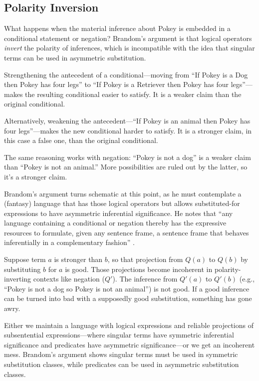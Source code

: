 \documentclass[12pt]{book}
\begin{document}
\subsection*{Polarity Inversion}\label{polarity-inversion}

What happens when the material inference about Pokey is embedded in a conditional statement or negation? Brandom's argument is that logical operators \emph{invert} the polarity of inferences, which is incompatible with the idea that singular terms can be used in asymmetric substitution.

Strengthening the antecedent of a conditional---moving from ``If Pokey is a Dog then Pokey has four legs'' to ``If Pokey is a Retriever then Pokey has four legs''---makes the resulting conditional easier to satisfy. It is a weaker claim than the original conditional.

Alternatively, weakening the antecedent---``If Pokey is an animal then Pokey has four legs''---makes the new conditional harder to satisfy. It is a stronger claim, in this case a false one, than the original conditional.

The same reasoning works with negation: ``Pokey is not a dog'' is a weaker claim than ``Pokey is not an animal.'' More possibilities are ruled out by the latter, so it's a stronger claim.

Brandom's argument turns schematic at this point, as he must contemplate a (fantasy) language that has those logical operators but allows substituted-for expressions to have asymmetric inferential significance. He notes that ``any language containing a conditional or negation thereby has the expressive resources to formulate, given any sentence frame, a sentence frame that behaves inferentially in a complementary fashion'' \parencite[146]{Brandom2000}.

Suppose term \(a\) is stronger than \(b\), so that projection from \(Q(a)\) to \(Q(b)\) by substituting \(b\) for \(a\) is good. Those projections become incoherent in polarity-inverting contexts like negation (\(Q'\)). The inference from \(Q'(a)\) to \(Q'(b)\) (e.g., ``Pokey is not a dog so Pokey is not an animal'') is not good. If a good inference can be turned into bad with a supposedly good substitution, something has gone awry.

Either we maintain a language with logical expressions and reliable projections of subsentential expressions---where singular terms have symmetric inferential significance and predicates have asymmetric significance---or we get an incoherent mess. Brandom's argument shows singular terms must be used in symmetric substitution classes, while predicates can be used in asymmetric substitution classes.
\end{document}
